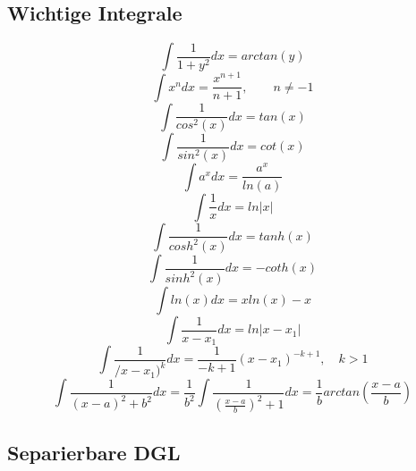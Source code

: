 \documentclass[12pt,a4paper]{article}%
\numberwithin{equation}{section}
\numberwithin{equation}{subsection}
\begin{document}
\subsection{Wichtige Integrale}
\begin{equation}
  \int \frac{1}{1+y^2} dx = arctan(y)
\end{equation}
\begin{equation}
  \int x^n dx = \frac{x^{n+1}}{n+1}, \qquad n \neq -1
\end{equation}
\begin{equation}
  \int \frac{1}{cos^2(x)} dx = tan(x)
\end{equation}
\begin{equation}
  \int \frac{1}{sin^2(x)} dx = cot(x)
\end{equation}
\begin{equation}
  \int a^x dx = \frac{a^x}{ln(a)}
\end{equation}
\begin{equation}
  \int \frac{1}{x} dx = ln|x|
\end{equation}
\begin{equation}
  \int \frac{1}{cosh^2(x)} dx = tanh(x)
\end{equation}
\begin{equation}
  \int \frac{1}{sinh^2(x)} dx = -coth(x)
\end{equation}
\begin{equation}
  \int ln(x) dx = x ln(x) -x
\end{equation}
\begin{equation}
  \int \frac{1}{x-x_1} dx = ln|x-x_1|
\end{equation}
\begin{equation}
  \int \frac{1}{/x-x_1)^k} dx = \frac{1}{-k+1}(x-x_1)^{-k+1}, \quad k>1
\end{equation}
\begin{equation}
  \int \frac{1}{(x-a)^2+b^2}dx = \frac{1}{b^2} \int \frac{1}{\left(\frac{x-a}{b}\right)^2 +1} dx = \frac{1}{b} arctan\left(\frac{x-a}{b}\right)
\end{equation}

\subsection{Separierbare DGL}
\end{document}
